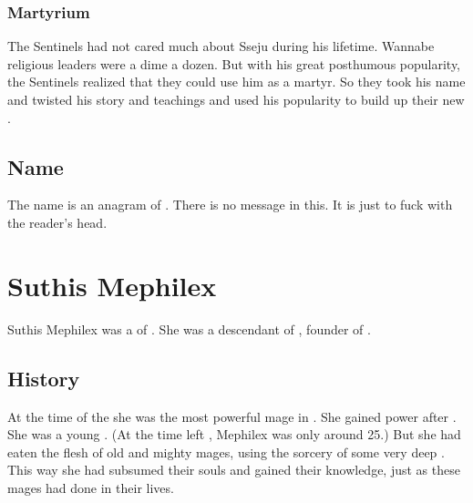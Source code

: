 \subsubsection{Martyrium}
The Sentinels had not cared much about Sseju during his lifetime. 
Wannabe religious leaders were a dime a dozen.
But with his great posthumous popularity, the Sentinels realized that they could use him as a martyr.
So they took his name and twisted his story and teachings and used his popularity to build up their new . 









\subsection{Name}
The name  is an anagram of .
There is no message in this.
It is just to fuck with the reader's head. 















\section{Suthis Mephilex}
Suthis Mephilex was a \rethyax \scatha of \Yormis. 
She was a descendant of , founder of \Yormis. 









\subsection{History}
At the time of the \thirdbanewar she was the most powerful mage in \Yormis. 
She gained power after .
She was a young \sphyle. 
(At the time  left \Yormis, Mephilex was only around 25.)
But she had eaten the flesh of old and mighty mages, using the sorcery of some very deep \arcana.
This way she had subsumed their souls and gained their knowledge, just as these mages had done in their lives. 

